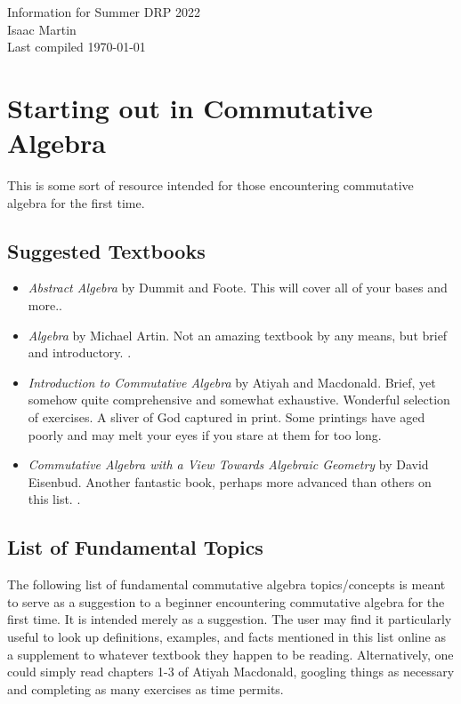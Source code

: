 


\pagestyle{empty}
	\LARGE
\begin{center}
	Information for Summer DRP 2022\\
	\Large
	Isaac Martin \\
    Last compiled \today
\end{center}
\normalsize
\vspace{-2mm}
\hru

\section{Starting out in Commutative Algebra}
This is some sort of resource intended for those encountering commutative algebra for the first time.
\subsection{Suggested Textbooks}
\begin{itemize}
	\item \emph{Abstract Algebra} by Dummit and Foote. This will cover all of your bases and more.\cite{dummit-foote}.
	\item \emph{Algebra} by Michael Artin. Not an amazing textbook by any means, but brief and introductory. \cite{artin-algebra}.
	\item \emph{Introduction to Commutative Algebra} by Atiyah and Macdonald. Brief, yet somehow quite comprehensive and somewhat exhaustive. Wonderful selection of exercises. A sliver of God captured in print. Some printings have aged poorly and may melt your eyes if you stare at them for too long. \cite{am}
	\item \emph{Commutative Algebra with a View Towards Algebraic Geometry} by David Eisenbud. Another fantastic book, perhaps more advanced than others on this list. \cite{eisenbud-com-alg}.
\end{itemize}

\subsection{List of Fundamental Topics}

The following list of fundamental commutative algebra topics/concepts is meant to serve as a suggestion to a beginner encountering commutative algebra for the first time. It is intended merely as a suggestion. The user may find it particularly useful to look up definitions, examples, and facts mentioned in this list online as a supplement to whatever textbook they happen to be reading. Alternatively, one could simply read chapters 1-3 of Atiyah Macdonald, googling things as necessary and completing as many exercises as time permits.

